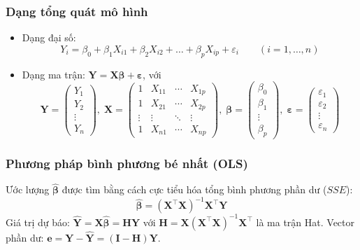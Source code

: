 \documentclass[12pt,a4paper]{article}
\begin{document}
\subsubsection{Dạng tổng quát mô hình}
\begin{itemize}
  \item Dạng đại số:
  \begin{equation}
    Y_i = \beta_0 + \beta_1 X_{i1} + \beta_2 X_{i2} + \dots + \beta_p X_{ip} + \varepsilon_i
    \qquad (i = 1,\dots,n)
  \end{equation}
  \item Dạng ma trận: $\mathbf{Y} = \mathbf{X}\boldsymbol{\beta} + \boldsymbol{\varepsilon}$, với
  \begin{equation}
    \mathbf{Y} = \begin{pmatrix} Y_1\\ Y_2\\ \vdots\\ Y_n \end{pmatrix},\;
    \mathbf{X} = \begin{pmatrix}
      1 & X_{11} & \cdots & X_{1p}\\
      1 & X_{21} & \cdots & X_{2p}\\
      \vdots & \vdots & \ddots & \vdots\\
      1 & X_{n1} & \cdots & X_{np}
    \end{pmatrix},\;
    \boldsymbol{\beta} = \begin{pmatrix} \beta_0\\ \beta_1\\ \vdots\\ \beta_p \end{pmatrix},\;
    \boldsymbol{\varepsilon} = \begin{pmatrix} \varepsilon_1\\ \varepsilon_2\\ \vdots\\ \varepsilon_n \end{pmatrix}
  \end{equation}
\end{itemize}

\subsubsection{Phương pháp bình phương bé nhất (OLS)}

Ước lượng $\hat{\boldsymbol{\beta}}$ được tìm bằng cách cực tiểu hóa tổng bình phương phần dư
($SSE$):
\begin{equation}
  \hat{\boldsymbol{\beta}} = (\mathbf{X}^\top\mathbf{X})^{-1}\mathbf{X}^\top\mathbf{Y}
\end{equation}
Giá trị dự báo: $\hat{\mathbf{Y}} = \mathbf{X}\hat{\boldsymbol{\beta}} = \mathbf{H}\mathbf{Y}$
với $\mathbf{H} = \mathbf{X}(\mathbf{X}^\top\mathbf{X})^{-1}\mathbf{X}^\top$ là ma trận Hat.
Vector phần dư: $\mathbf{e} = \mathbf{Y} - \hat{\mathbf{Y}} = (\mathbf{I} - \mathbf{H})\mathbf{Y}$.
\end{document}
